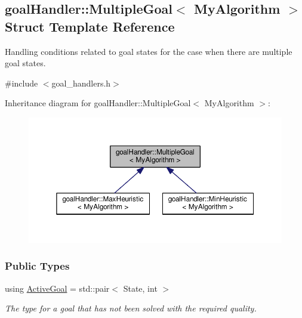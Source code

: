 \hypertarget{structgoalHandler_1_1MultipleGoal}{}\subsection{goal\+Handler\+:\+:Multiple\+Goal$<$ My\+Algorithm $>$ Struct Template Reference}
\label{structgoalHandler_1_1MultipleGoal}


Handling conditions related to goal states for the case when there are multiple goal states.  




{\ttfamily \#include $<$goal\+\_\+handlers.\+h$>$}



Inheritance diagram for goal\+Handler\+:\+:Multiple\+Goal$<$ My\+Algorithm $>$\+:\nopagebreak
\begin{figure}[H]
\begin{center}
\leavevmode
\includegraphics[width=350pt]{structgoalHandler_1_1MultipleGoal__inherit__graph}
\end{center}
\end{figure}
\subsubsection*{Public Types}
\begin{DoxyCompactItemize}
\item 
using \hyperlink{structgoalHandler_1_1MultipleGoal_a8fd8f62fd989f66b55abbed77c1d3bc9}{Active\+Goal} = std\+::pair$<$ State, int $>$\hypertarget{structgoalHandler_1_1MultipleGoal_a8fd8f62fd989f66b55abbed77c1d3bc9}{}\label{structgoalHandler_1_1MultipleGoal_a8fd8f62fd989f66b55abbed77c1d3bc9}

\begin{DoxyCompactList}\small\item\em The type for a goal that has not been solved with the required quality. \end{DoxyCompactList}\end{DoxyCompactItemize}

